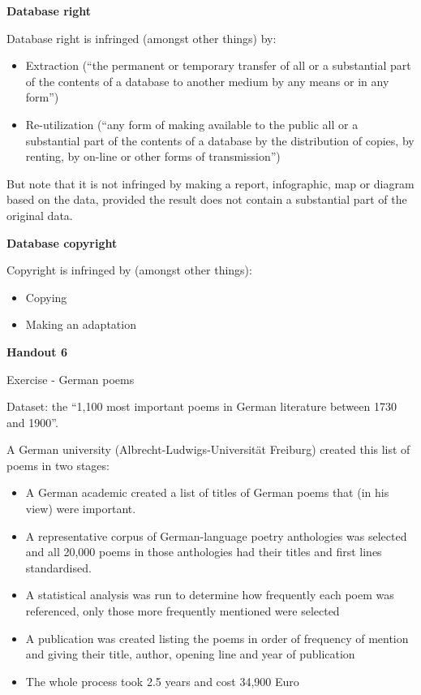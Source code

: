 \textbf{Database right}

Database right is infringed (amongst other things) by:

\begin{itemize}
\item
  Extraction (``the permanent or temporary transfer of all or a
  substantial part of the contents of a database to another medium by
  any means or in any form'')
\item
  Re-utilization (``any form of making available to the public all or a
  substantial part of the contents of a database by the distribution of
  copies, by renting, by on-line or other forms of transmission'')
\end{itemize}

But note that it is not infringed by making a report, infographic, map
or diagram based on the data, provided the result does not contain a
substantial part of the original data.

\textbf{Database copyright}

Copyright is infringed by (amongst other things):

\begin{itemize}
\item
  Copying
\item
  Making an adaptation
\end{itemize}

\textbf{Handout 6}

Exercise - German poems

Dataset: the ``1,100 most important poems in German literature between
1730 and 1900''.

A German university (Albrecht-Ludwigs-Universität Freiburg) created this
list of poems in two stages:

\begin{itemize}
\item
  A German academic created a list of titles of German poems that (in
  his view) were important.
\item
  A representative corpus of German-language poetry anthologies was
  selected and all 20,000 poems in those anthologies had their titles
  and first lines standardised.
\item
  A statistical analysis was run to determine how frequently each poem
  was referenced, only those more frequently mentioned were selected
\item
  A publication was created listing the poems in order of frequency of
  mention and giving their title, author, opening line and year of
  publication
\item
  The whole process took 2.5 years and cost 34,900 Euro
\end{itemize}

